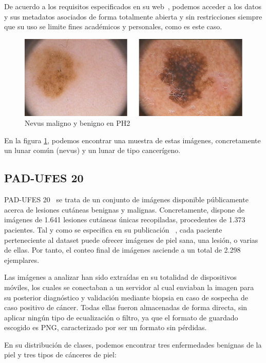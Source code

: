 De acuerdo a los requisitos especificados en su web~\cite{ph2data}, podemos acceder a los datos  y sus metadatos asociados de forma totalmente abierta y sin restricciones siempre que su uso se limite fines académicos y personales, como es este caso.
\begin{figure}[H]
	\centering
	\includegraphics[scale = 0.6]{imagenes/PH2.png}
	\caption{Nevus maligno y benigno en PH2}
	\label {ph2}
\end{figure}

En la figura \ref{ph2}, podemos encontrar una muestra de estas imágenes, concretamente un lunar común (nevus) y un lunar de tipo cancerígeno.

\subsection{PAD-UFES 20}
\label{padufesdesc}
PAD-UFES 20~\cite{PACHECO2020106221} se trata de un conjunto de imágenes disponible públicamente acerca de lesiones cutáneas benignas y malignas. Concretamente, dispone de imágenes de 1.641 lesiones cutáneas únicas recopiladas, procedentes de 1.373 pacientes. Tal y como se especifica en su publicación ~\cite{PACHECO2020106221}, cada paciente perteneciente al dataset puede ofrecer imágenes de piel sana, una lesión, o varias de ellas. Por tanto, el conteo final de imágenes asciende a un total de 2.298 ejemplares.

Las imágenes a analizar han sido extraídas en su totalidad de dispositivos móviles, los cuales se conectaban a un servidor al cual enviaban la imagen para su posterior diagnóstico y validación mediante biopsia en caso de sospecha de caso positivo de cáncer. Todas ellas fueron almacenadas de forma directa, sin aplicar ningún tipo de ecualización o filtro, ya que el formato de guardado escogido es PNG, caracterizado por ser un formato sin pérdidas.

En su distribución de clases, podemos encontrar tres enfermedades benignas de la piel y tres tipos de cánceres de piel:

